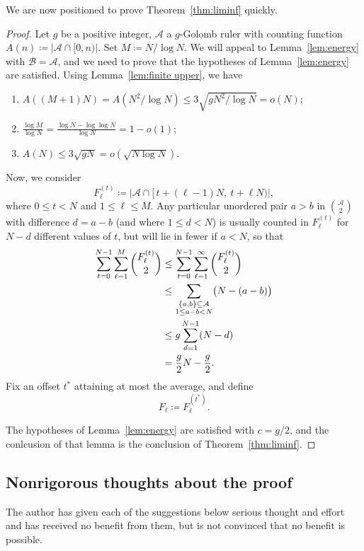 \documentclass[10pt]{article}
\newcommand{\cA}{\mathcal{A}}
\newcommand{\cB}{\mathcal{B}}
\begin{document}
We are now positioned to prove Theorem~\ref{thm:liminf} quickly.

\begin{proof}
Let $g$ be a positive integer, $\cA$ a $g$-Golomb ruler with counting function $A(n) \coloneqq |\cA \cap[0,n)|$. Set $M \coloneqq N/\log N$. We will appeal to Lemma~\ref{lem:energy} with $\cB=\cA$, and we need to prove that the hypotheses of Lemma~\ref{lem:energy} are satisfied. Using Lemma~\ref{lem:finite upper}, we have
\begin{enumerate}[label=\textit{(\roman*)},noitemsep]
  \item $A((M+1)N) = A(N^2/\log N) \le 3 \sqrt{gN^2/\log N} = o(N)$;
  \item $\frac{\log M}{\log N} = \frac{\log N- \log\log N}{\log N}= 1-o(1)$;
  \item $A(N)\le 3 \sqrt{gN} = o(\sqrt{N \log N})$.
\end{enumerate}

Now, we consider 
    \[F_\ell^{(t)}\coloneqq \left| \cA\cap[\,t+(\ell-1)N,\ t+\ell N)\right|,\] 
where $0\le t < N$ and $1\le \ell \le M$.
Any particular unordered pair $a>b$ in $\binom{\cA}{2}$ with difference $d=a-b$ (and where $1\le d < N$) is usually counted in
$F_\ell^{(t)}$ for $N-d$ different values of $t$, but will lie in fewer if $a<N$, so that
\begin{align}
   \sum_{t=0}^{N-1}\sum_{\ell=1}^{M}\binom{F_\ell^{(t)}}{2}
   &\le \sum_{t=0}^{N-1}\sum_{\ell=1}^{\infty}\binom{F_\ell^{(t)}}{2} \notag \\
   &\le \sum_{\substack{\{a,b\}\subseteq\cA\\1\le a-b < N}} \bigl(N-(a-b)\bigr) \notag\\
   &\le g \sum_{d=1}^{N-1}(N-d) \notag\\
   &=\frac{g}{2} N - \frac g2. \label{eq:half}
\end{align}
Fix an offset $t^\ast$ attaining at most the average, and define
    \[F_\ell\coloneqq F_\ell^{(t^\ast)}.\]

The hypotheses of Lemma~\ref{lem:energy} are satisfied with $c=g/2$, and the conlcusion of that lemma is the conclusion of Theorem~\ref{thm:liminf}.
\end{proof}

\subsection{Nonrigorous thoughts about the proof}
The author has given each of the suggestions below serious thought and effort and has received no benefit from them, but is not convinced that no benefit is possible.
\end{document}
